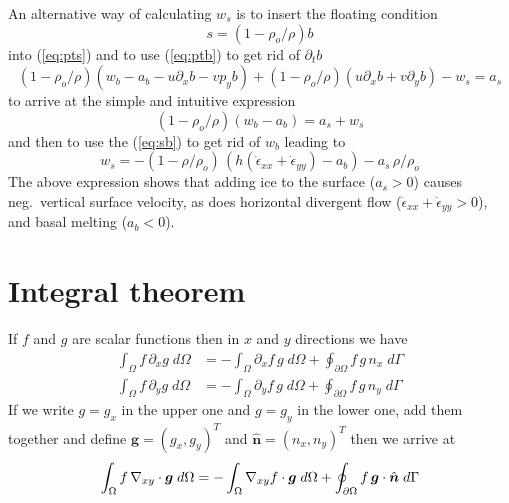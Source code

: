 \documentclass[10pt,a4paper]{book}
\newcommand{\p}{\partial}
\newcommand{\exx}{\dot{\epsilon}_{xx}}
\newcommand{\eyy}{\dot{\epsilon}_{yy}}
\begin{document}
An alternative way of calculating $w_s$ is to insert the floating condition
\[ 
s=(1-\rho_o/\rho) b 
\]
into (\ref{eq:pts}) and to use (\ref{eq:ptb}) to get rid of $\p_t b$ 
\begin{equation} 
(1-\rho_o/\rho) (w_b-a_b-u \p_x b-v p_y b) + (1-\rho_o/\rho) (u \p_x b + v \p_y b) -w_s =a_s 
\label{eq:pts2} 
\end{equation}
to arrive at the simple and intuitive expression
\begin{equation} 
(1-\rho_o/\rho) (w_b-a_b)  =a_s+w_s 
\label{eq:pts3} 
\end{equation}
and then to use the (\ref{eq:sb}) to get rid of $w_b$ leading to
\begin{equation} 
 w_s =  -(1-\rho/\rho_o)\,  \left (h(\exx+\eyy) - a_b\right ) - a_s \, \rho /\rho_o  
\label{eq:wsfloating3}
\end{equation} 
The above expression shows that adding ice to the surface ($a_s>0$)  causes neg.\ vertical
surface velocity, as does horizontal divergent flow ($\exx+\eyy>0$), and basal melting ($a_b<0$).



\chapter{Integral theorem}

If $f$ and $g$ are scalar functions then in $x$ and $y$ directions we have
\begin{align}
\int_{\Omega} f \, \p_x g \; d \Omega &= - \int_{\Omega} \p_x f \, g \; d \Omega + \oint_{\p \Omega} f \, g \, n_x \; d \Gamma \\
\int_{\Omega} f \, \p_y g \; d \Omega &= - \int_{\Omega} \p_y f \, g \; d \Omega + \oint_{\p \Omega} f \, g \, n_y \; d \Gamma
\end{align}
If we write $g=g_x$ in the upper one and $g=g_y$ in the lower one, add
them together and define $\bm{g}=(g_x,g_y)^T$ and
$\hat{\bm{n}}=(n_x,n_y)^T$ then we arrive at
\begin{equation}
\int_{\Omega} f \, \nabla_{xy} \cdot \bm{g} \; d \Omega = -
\int_{\Omega} \nabla_{xy} f \cdot \bm{g} \; d \Omega + \oint_{\p
  \Omega} f \, \bm{g} \cdot \hat{\bm{n}} \; d \Gamma \\
\label{eq:fgg}
\end{equation}
\end{document}
